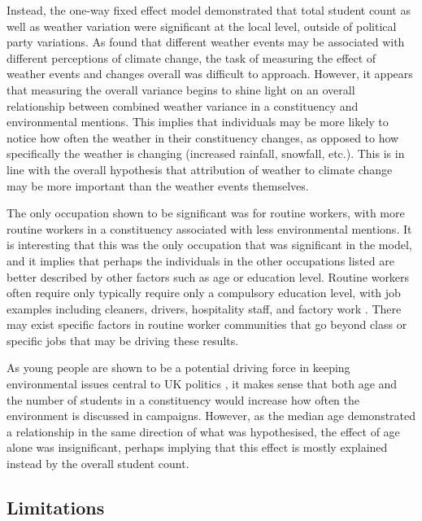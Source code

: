\documentclass[12pt,letterpaper]{article}
\begin{document}
Instead, the one-way fixed effect model demonstrated that total student count as well as weather variation were significant at the local level, outside of political party variations. As \textcite{loComeRainShine2015} found that different weather events may be associated with different perceptions of climate change, the task of measuring the effect of weather events and changes overall was difficult to approach. However, it appears that measuring the overall variance begins to shine light on an overall relationship between combined weather variance in a constituency and environmental mentions. This implies that individuals may be more likely to notice how often the weather in their constituency changes, as opposed to how specifically the weather is changing (increased rainfall, snowfall, etc.). This is in line with the overall hypothesis that attribution of weather to climate change may be more important than the weather events themselves.

The only occupation shown to be significant was for routine workers, with more routine workers in a constituency associated with less environmental mentions. It is interesting that this was the only occupation that was significant in the model, and it implies that perhaps the individuals in the other occupations listed are better described by other factors such as age or education level. Routine workers often require only  typically require only a
compulsory education level, with job examples including cleaners, drivers, hospitality staff, and factory work \autocite{binesRoutineManualWorkers2024}. There may exist specific factors in routine worker communities that go beyond class or specific jobs that may be driving these results. 

As young people are shown to be a potential driving force in keeping environmental issues central to UK politics \autocite{burnsWillBrexitDegrade2020}, it makes sense that both age and the number of students in a constituency would increase how often the environment is discussed in campaigns. However, as the median age demonstrated a relationship in the same direction of what was hypothesised, the effect of age alone was insignificant, perhaps implying that this effect is mostly explained instead by the overall student count. 




\subsection{Limitations}
\end{document}
